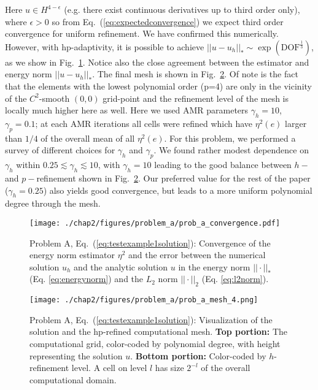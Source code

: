 Here $u \in H^{4-\epsilon}$ (e.g. there exist continuous derivatives up to third order only), where $\epsilon > 0$ so from
Eq.~(\ref{eq:expectedconvergence}) we expect third order convergence
for uniform refinement. We have confirmed this numerically. However,
with hp-adaptivity, it is possible to achieve $||u-u_{h}||_{*} \sim
\exp(\text{DOF}^{\frac{1}{3}})$, as we show in
Fig.~\ref{fig:test_example_1_u_convergence}. Notice also the close
agreement between the estimator and energy norm $||u-u_{h}||_*$. The final mesh is shown in Fig.~\ref{fig:test_example_1_mesh}. Of
note is the fact that the elements with the lowest polynomial order
(p=4) are only in the vicinity of the $C^{2}$-smooth $(0,0)$
grid-point and the refinement level of the mesh is locally much higher
here as well. Here we
used AMR parameters $\gamma_h = 10$, $\gamma_p = 0.1$; at each AMR
iterations all cells were refined which have $\eta^2(e)$ larger than
$1/4$ of the overall mean of all $\eta^2(e)$. For this
problem, we performed a survey of different choices for $\gamma_h$
and $\gamma_p$.  We found rather modest dependence on $\gamma_h$
within $0.25\lesssim \gamma_h\lesssim 10$, with $\gamma_h\!=\!10$ leading to the good balance between
$h-$ and $p-$refinement shown in Fig.~\ref{fig:test_example_1_mesh}.
Our preferred value for the rest of the paper ($\gamma_h=0.25$) also
yields good convergence, but leads to a more uniform polynomial
degree through the mesh.

\begin{figure}[ht!]
  \centering
  \texttt{[image: ./chap2/figures/problem\_a/prob\_a\_convergence.pdf]}
  \caption{Problem A, Eq.~(\ref{eq:testexample1solution}): Convergence of the energy norm estimator $\eta^2$ and the error between the numerical solution $u_h$ and the analytic solution $u$ in the energy norm $||\cdot||_*$ (Eq. \ref{eq:energynorm}) and the $L_2$ norm $||\cdot||_2$ (Eq. \ref{eq:l2norm}).}
  \label{fig:test_example_1_u_convergence} 
\end{figure}

\begin{figure}[htbp!]
  \centering
  \texttt{[image: ./chap2/figures/problem\_a/prob\_a\_mesh\_4.png]}
  
  \caption{ \label{fig:test_example_1_mesh} Problem A,
    Eq.~(\ref{eq:testexample1solution}): Visualization of the
      solution and the hp-refined computational mesh.  {\bf Top
        portion:} The computational grid, color-coded by polynomial
      degree, with height representing the solution $u$.  {\bf Bottom
        portion:} Color-coded by $h$-refinement level.  A cell on
      level $l$ has size $2^{-l}$ of the overall computational
      domain.}
\end{figure}

